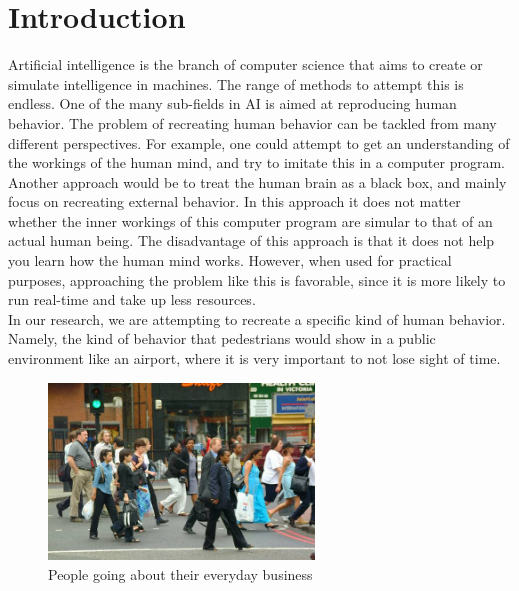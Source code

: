 \documentclass[11pt, a4paper]{book}
\begin{document}
\chapter{Introduction}
Artificial intelligence is the branch of computer science that aims to create or simulate intelligence in machines. The range of methods to attempt this is endless. One of the many sub-fields in AI is aimed at reproducing human behavior. The problem of recreating human behavior can be tackled from many different perspectives. For example, one could attempt to get an understanding of the workings of the human mind, and try to imitate this in a computer program. \\
Another approach would be to treat the human brain as a black box, and mainly focus on recreating external behavior. In this approach it does not matter whether the inner workings of this computer program are simular to that of an actual human being. The disadvantage of this approach is that it does not help you learn how the human mind works. However, when used for practical purposes, approaching the problem like this is favorable, since it is more likely to run real-time and take up less resources.\\
In our research, we are attempting to recreate a specific kind of human behavior. Namely, the kind of behavior that pedestrians would show in a public environment like an airport,  where it is very important to not lose sight of time.\\
\begin{figure}[h]
\begin{center}
\includegraphics[width=200pt]{pedestrians.jpg}
\end{center}
\caption{People going about their everyday business}
\label{pedestrianpicture}
\end{figure}
\end{document}
